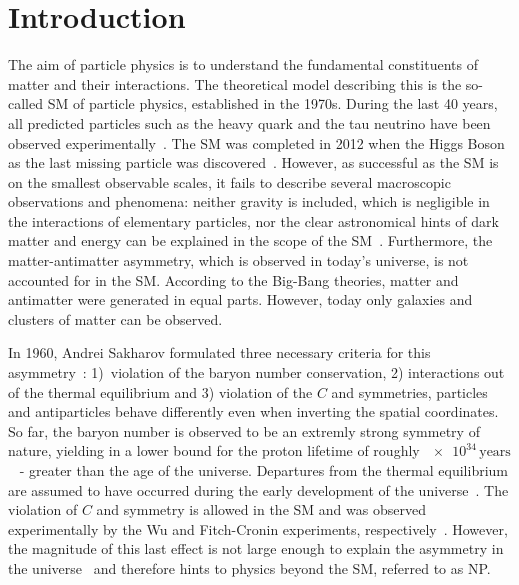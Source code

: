 \chapter{Introduction}

\linespread{1.08}\selectfont

The aim of particle physics is to understand the fundamental constituents of matter and their interactions.
The theoretical model describing this is the so-called \ac{SM} of particle physics, established in the \num{1970}s.
During the last \num{40} years, all predicted particles such as the heavy \tquark quark and the tau neutrino have been observed experimentally~\cite{Abachi:1994td,Abe:1995hr,Kodama:2000mp}.
The \ac{SM} was completed in \num{2012} when the Higgs Boson as the last missing particle was discovered~\cite{Chatrchyan:2012xdj, Aad:2012tfa}.
However, as successful as the \ac{SM} is on the smallest observable scales, it fails to describe several macroscopic observations and phenomena:
neither gravity is included, which is negligible in the interactions of elementary particles, nor the clear astronomical hints of dark matter and energy can be explained in the scope of the \ac{SM}~\cite{Corbelli:1999af,Kowalski:2008ez}.
Furthermore, the matter-antimatter asymmetry, which is observed in today's universe, is not accounted for in the \ac{SM}.
According to the Big-Bang theories, matter and antimatter were generated in equal parts.
However, today only galaxies and clusters of matter can be observed.

In \num{1960}, Andrei Sakharov formulated three necessary criteria for this asymmetry~\cite{Sakharov:1967dj}: \mbox{1) violation} of the baryon number conservation, 2) interactions out of the thermal equilibrium and 3) violation of the $C$ and \CP symmetries, \ie particles and antiparticles behave differently even when inverting the spatial coordinates.
So far, the baryon number is observed to be an extremly strong symmetry of nature, yielding in a lower bound for the proton lifetime of roughly $\num{e34}\,\text{years}$~\cite{Nishino:2009aa} - greater than the age of the universe.
Departures from the thermal equilibrium are assumed to have occurred during the early development of the universe~\cite{Kolb:1990vq}.
The violation of $C$ and \CP symmetry is allowed in the \ac{SM} and was observed experimentally by the Wu and Fitch-Cronin experiments, respectively~\cite{Wu:1957my, Christenson:1964fg}.
However, the magnitude of this last effect is not large enough to explain the asymmetry in the universe~\cite{Gavela:1993ts} and therefore hints to physics beyond the \ac{SM}, referred to as \ac{NP}.

